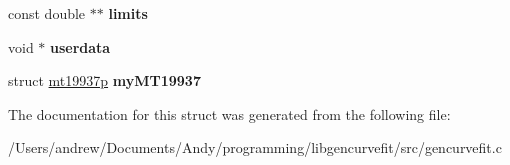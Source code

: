 \begin{DoxyCompactItemize}
\item 
\hypertarget{structgenopt_struct_af5f297feacd7f6e76a94d97ab4260115}{
const double $\ast$$\ast$ {\bfseries limits}}
\label{structgenopt_struct_af5f297feacd7f6e76a94d97ab4260115}

\item 
\hypertarget{structgenopt_struct_afd0ffb02780e738d4c0a10ab833b7834}{
void $\ast$ {\bfseries userdata}}
\label{structgenopt_struct_afd0ffb02780e738d4c0a10ab833b7834}

\item 
\hypertarget{structgenopt_struct_a41112b3def7b5aec9aca550ada5c0562}{
struct \hyperlink{structmt19937p}{mt19937p} {\bfseries myMT19937}}
\label{structgenopt_struct_a41112b3def7b5aec9aca550ada5c0562}

\end{DoxyCompactItemize}


The documentation for this struct was generated from the following file:\begin{DoxyCompactItemize}
\item 
/Users/andrew/Documents/Andy/programming/libgencurvefit/src/gencurvefit.c\end{DoxyCompactItemize}
